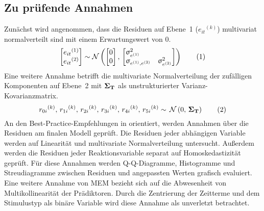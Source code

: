 	\subsection{Zu prüfende Annahmen}
			Zunächst wird angenommen, dass die Residuen auf Ebene~1 ($e_{it}{}^{(k)}$) multivariat normalverteilt sind mit einem Erwartungswert von $0$. %
			\begin{equation*}
				\begin{bmatrix}e_{it}{}^{(1)} \\ e_{it}{}^{(2)}\\\end{bmatrix}
				\sim \mathcal{N}
				\left( \begin{bmatrix} 0 \\ 0 \end{bmatrix} ,\, \begin{bmatrix*}[l]
					\upsigma^2_{e^{(1)}} & \\  \upsigma_{e^{(1)},e^{(2)}} & \upsigma^2_{e^{(2)}}
				\end{bmatrix*}\right) 
				\nr\label{eq:assum1}
			\end{equation*}			
			Eine weitere Annahme betrifft die multivariate Normalverteilung der zufälligen Komponenten auf Ebene~2 mit $\mathbf{\Sigma_T}$ als unstrukturierter Varianz-Kovarianzmatrix.
			\begin{equation*}
				r_{0i}{}^{(k)},\, r_{1i}{}^{(k)},\,r_{2i}{}^{(k)},\,
				r_{3i}{}^{(k)},\, r_{4i}{}^{(k)},\, r_{5i}{}^{(k)}
				\sim \, \mathcal{N}\left(0,\,\mat{\Sigma_T}\right)
				\nr\label{eq:assum3}
			\end{equation*}	
			An den Best-Practice-Empfehlungen in \textcite{METEYARD2020} orientiert, werden Annahmen über die Residuen am finalen Modell geprüft.
			Die Residuen jeder abhängigen Variable werden auf Linearität und multivariate Normalverteilung untersucht.
			Außerdem werden die Residuen jeder Reaktionsvariable separat auf Homoskedastizität geprüft. 
			Für diese Annahmen werden Q-Q-Diagramme, Histogramme und Streudiagramme zwischen Residuen und angepassten Werten grafisch evaluiert.   
			Eine weitere Annahme von MEM bezieht sich auf die Abwesenheit von Multikollinearität der Prädiktoren. Durch die Zentrierung der Zeitterme und dem Stimulustyp als binäre Variable wird diese Annahme als unverletzt betrachtet.

